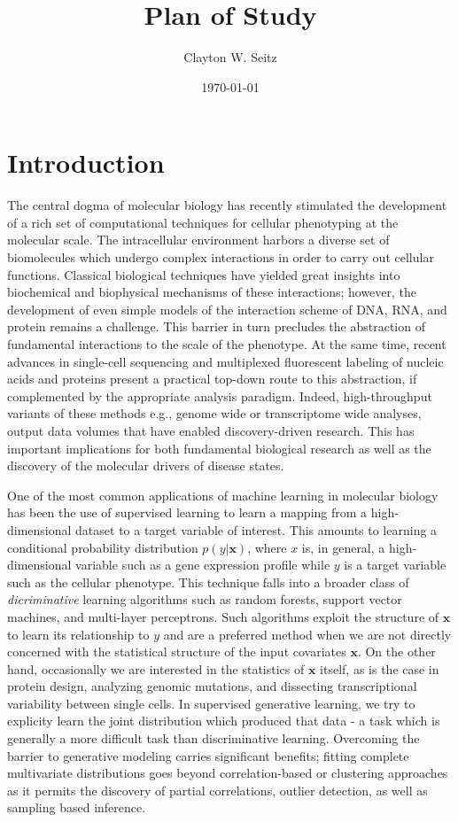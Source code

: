 \documentclass{article}
\title{Plan of Study}
\author{Clayton W. Seitz}
\date{\today}
\begin{document}
  \maketitle%
\vspace{0.4in}

\section{Introduction}

The central dogma of molecular biology has recently stimulated the development of a rich set of computational techniques for cellular phenotyping at the molecular scale. The intracellular environment harbors a diverse set of biomolecules which undergo complex interactions in order to carry out cellular functions. Classical biological techniques have yielded great insights into biochemical and biophysical mechanisms of these interactions; however, the development of even simple models of the interaction scheme of DNA, RNA, and protein remains a challenge. This barrier in turn precludes the abstraction of fundamental interactions to the scale of the phenotype. At the same time, recent advances in single-cell sequencing and multiplexed fluorescent labeling of nucleic acids and proteins present a practical top-down route to this abstraction, if complemented by the appropriate analysis paradigm. Indeed, high-throughput variants of these methods e.g., genome wide or transcriptome wide analyses,  output data volumes that have enabled discovery-driven research. This has important implications for both fundamental biological research as well as the discovery of the molecular drivers of disease states.

One of the most common applications of machine learning in molecular biology has been the use of supervised learning to learn a mapping from a high-dimensional dataset to a target variable of interest. This amounts to learning a conditional probability distribution $p(y|\mathbf{x})$, where $x$ is, in general, a high-dimensional variable such as a gene expression profile while $y$ is a target variable such as the cellular phenotype. This technique falls into a broader class of \emph{dicriminative} learning algorithms such as random forests, support vector machines, and multi-layer perceptrons. Such algorithms exploit the structure of $\mathbf{x}$ to learn its relationship to $y$ and are a preferred method when we are not directly concerned with the statistical structure of the input covariates $\mathbf{x}$. On the other hand, occasionally we are interested in the statistics of $\mathbf{x}$ itself, as is the case in protein design, analyzing genomic mutations, and dissecting transcriptional variability between single cells. In supervised generative learning, we try to explicity learn the joint distribution which produced that data - a task which is generally a more difficult task than discriminative learning. Overcoming the barrier to generative modeling carries significant benefits; fitting complete multivariate distributions goes beyond correlation-based or clustering approaches as it permits the discovery of partial correlations, outlier detection, as well as sampling based inference. 
\end{document}
